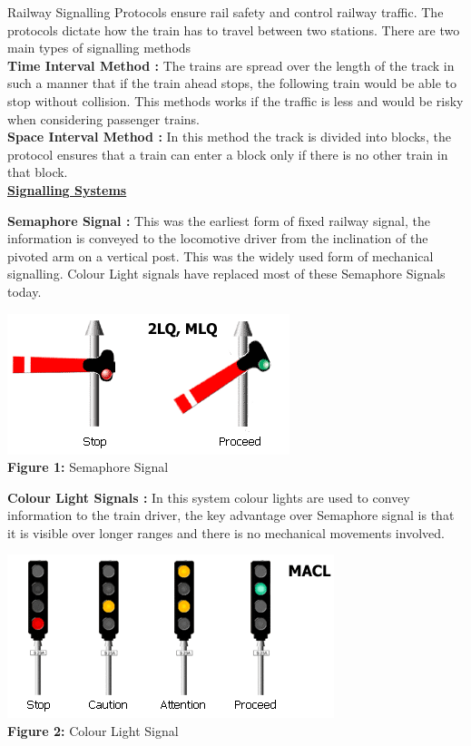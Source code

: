 \documentclass[twoside,11pt]{article}
\begin{document}
Railway Signalling Protocols ensure rail safety and control railway traffic.
The protocols dictate how the train has to travel between two stations.
There are two main types of signalling methods \vspace{0.2in} \\
{\bf Time Interval Method :} The trains are spread over the length of the track
in such a manner that if the train ahead stops, the following train would be 
able to stop without collision. This methods works if the traffic is less and
would be risky when considering passenger trains. \\
{\bf Space Interval Method :} In this method the track is divided into 
blocks, the protocol ensures that a train can enter a block only if there is
no other train in that block.\\

{\noindent \underline{ \bf Signalling Systems }}  \vspace{0.05in} 

{\noindent \bf Semaphore Signal :} This was the earliest form of fixed railway 
signal, the information is conveyed to the locomotive driver from the inclination
of the pivoted arm on a vertical post. This was the widely used form of mechanical
signalling. Colour Light signals have replaced most of these Semaphore Signals today.
\begin{center}
	\includegraphics[scale=0.5]{img/2lq.png} \\
	\textbf{Figure 1:} Semaphore Signal  
\end{center}

{\noindent \bf Colour Light Signals : } In this system colour lights are used to 
convey information to the train driver, the key advantage over Semaphore signal is 
that it is visible over longer ranges and there is no mechanical movements involved.

\begin{center}
	\includegraphics[scale=0.6]{img/macl.png} \\
	\textbf{Figure 2:} Colour Light Signal 
\end{center}
\end{document}
